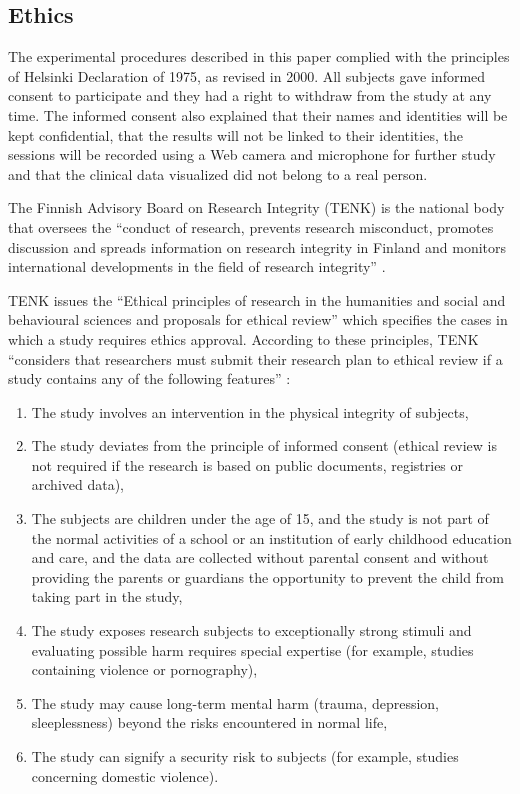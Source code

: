 \documentclass[twocolumn]{bmcart}%
\begin{document}
\subsection*{Ethics}

The experimental procedures described in this paper complied with the principles of Helsinki Declaration of 1975, as revised in 2000. All subjects gave informed consent to participate and they had a right to withdraw from the study at any time. The informed consent also explained that their names and identities will be kept confidential, that the results will not be linked to their identities, the sessions will be recorded using a Web camera and microphone for further study and that the clinical data visualized did not belong to a real person.

The Finnish Advisory Board on Research Integrity (TENK) is the national body that oversees the ``conduct of research, prevents research misconduct, promotes discussion and spreads information on research integrity in Finland and monitors international developments in the field of research integrity'' \cite{tenk2009}.

TENK issues the ``Ethical principles of research in the humanities and social and behavioural sciences and proposals for ethical review'' which specifies the cases in which a study requires ethics approval.  According to these principles, TENK ``considers that researchers must submit their research plan to ethical review if a study contains any of the following features'' \cite{tenk2009}:

\begin{enumerate}
\item The study involves an intervention in the physical integrity of subjects,
\item The study deviates from the principle of informed consent (ethical review is not required if the research is based on public documents, registries or archived data),
\item The subjects are children under the age of 15, and the study is not part of the normal activities of a school or an institution of early childhood education and care, and the data are collected without parental consent and without providing the parents or guardians the opportunity to prevent the child from taking part in the study,
\item The study exposes research subjects to exceptionally strong stimuli and evaluating possible harm requires special expertise (for example, studies containing violence or pornography),
\item The study may cause long-term mental harm (trauma, depression, sleeplessness) beyond the risks encountered in normal life,
\item The study can signify a security risk to subjects (for example, studies concerning domestic violence).
\end{enumerate}
\end{document}
